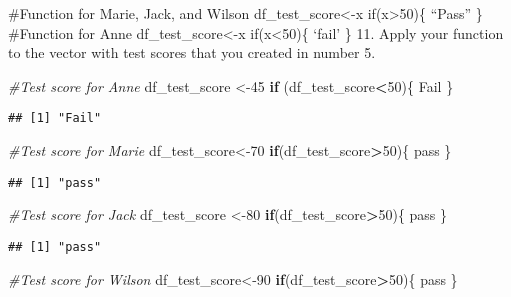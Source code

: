 \documentclass[
]{article}
\newenvironment{Shaded}{\begin{snugshade}}{\end{snugshade}}
\newcommand{\CommentTok}[1]{\textcolor[rgb]{0.56,0.35,0.01}{\textit{#1}}}
\newcommand{\ControlFlowTok}[1]{\textcolor[rgb]{0.13,0.29,0.53}{\textbf{#1}}}
\newcommand{\DecValTok}[1]{\textcolor[rgb]{0.00,0.00,0.81}{#1}}
\newcommand{\NormalTok}[1]{#1}
\newcommand{\OtherTok}[1]{\textcolor[rgb]{0.56,0.35,0.01}{#1}}
\newcommand{\SpecialCharTok}[1]{\textcolor[rgb]{0.81,0.36,0.00}{\textbf{#1}}}
\newcommand{\StringTok}[1]{\textcolor[rgb]{0.31,0.60,0.02}{#1}}
\begin{document}
\#Function for Marie, Jack, and Wilson df\_test\_score\textless-x
if(x\textgreater50)\{ ``Pass'' \} \#Function for Anne
df\_test\_score\textless-x if(x\textless50)\{ `fail' \} 11. Apply your
function to the vector with test scores that you created in number 5.

\begin{Shaded}
\begin{Highlighting}[]
\CommentTok{\#Test score for Anne}
\NormalTok{df\_test\_score }\OtherTok{\textless{}{-}}\DecValTok{45}
\ControlFlowTok{if}\NormalTok{ (df\_test\_score}\SpecialCharTok{\textless{}}\DecValTok{50}\NormalTok{)\{}
  \StringTok{\textquotesingle{}Fail\textquotesingle{}}
\NormalTok{\}}
\end{Highlighting}
\end{Shaded}

\begin{verbatim}
## [1] "Fail"
\end{verbatim}

\begin{Shaded}
\begin{Highlighting}[]
\CommentTok{\#Test score for Marie}
\NormalTok{df\_test\_score}\OtherTok{\textless{}{-}}\DecValTok{70}
\ControlFlowTok{if}\NormalTok{(df\_test\_score}\SpecialCharTok{\textgreater{}}\DecValTok{50}\NormalTok{)\{}
  \StringTok{\textquotesingle{}pass\textquotesingle{}}
\NormalTok{\}}
\end{Highlighting}
\end{Shaded}

\begin{verbatim}
## [1] "pass"
\end{verbatim}

\begin{Shaded}
\begin{Highlighting}[]
\CommentTok{\#Test score for Jack}
\NormalTok{df\_test\_score }\OtherTok{\textless{}{-}}\DecValTok{80}
\ControlFlowTok{if}\NormalTok{(df\_test\_score}\SpecialCharTok{\textgreater{}}\DecValTok{50}\NormalTok{)\{}
  \StringTok{\textquotesingle{}pass\textquotesingle{}}
\NormalTok{\}}
\end{Highlighting}
\end{Shaded}

\begin{verbatim}
## [1] "pass"
\end{verbatim}

\begin{Shaded}
\begin{Highlighting}[]
\CommentTok{\#Test score for Wilson}
\NormalTok{df\_test\_score}\OtherTok{\textless{}{-}}\DecValTok{90}
\ControlFlowTok{if}\NormalTok{(df\_test\_score}\SpecialCharTok{\textgreater{}}\DecValTok{50}\NormalTok{)\{}
  \StringTok{\textquotesingle{}pass\textquotesingle{}}
\NormalTok{\}}
\end{Highlighting}
\end{Shaded}
\end{document}
